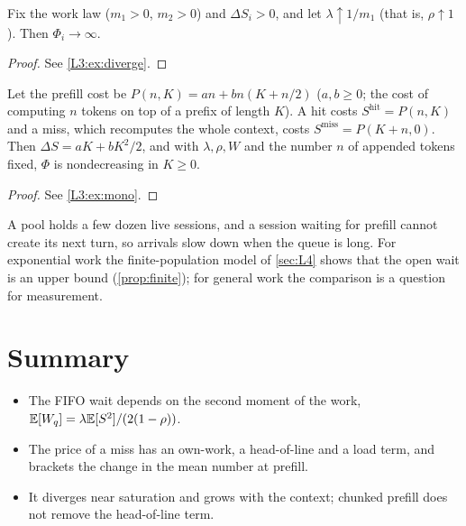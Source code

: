 \begin{corollary}\label{cor:price-diverge}
Fix the work law ($m_1>0$, $m_2>0$) and $\Delta S_i>0$, and let
$\lambda\uparrow1/m_1$ (that is, $\rho\uparrow1$). Then $\Phi_i\to\infty$.
\end{corollary}

\begin{proof}See \cref{L3:ex:diverge}.\end{proof}

\begin{corollary}\label{cor:price-mono}
Let the prefill cost be $P(n,K)=an+bn(K+n/2)$ ($a,b\ge0$; the cost of computing
$n$ tokens on top of a prefix of length $K$). A hit costs
$S^{\mathrm{hit}}=P(n,K)$ and a miss, which recomputes the whole context, costs
$S^{\mathrm{miss}}=P(K+n,0)$. Then $\Delta S=aK+bK^2/2$, and with $\lambda,\rho,W$
and the number $n$ of appended tokens fixed, $\Phi$ is nondecreasing in $K\ge0$.
\end{corollary}

\begin{proof}See \cref{L3:ex:mono}.\end{proof}


\begin{remark}\label{L3:rem:finite}
A pool holds a few dozen live sessions, and a session waiting for prefill cannot create
its next turn, so arrivals slow down when the queue is long. For exponential work the
finite-population model of \cref{sec:L4} shows that the open wait is an upper bound
(\cref{prop:finite}); for general work the comparison is a question for measurement.
\end{remark}

\section{Summary}
\begin{itemize}
\item The FIFO wait depends on the second moment of the work, $\mathbb{E}[W_q]=\lambda\mathbb{E}[S^2]/(2(1-\rho))$.
\item The price of a miss has an own-work, a head-of-line and a load term, and brackets the change in the mean number at prefill.
\item It diverges near saturation and grows with the context; chunked prefill does not remove the head-of-line term.
\end{itemize}

